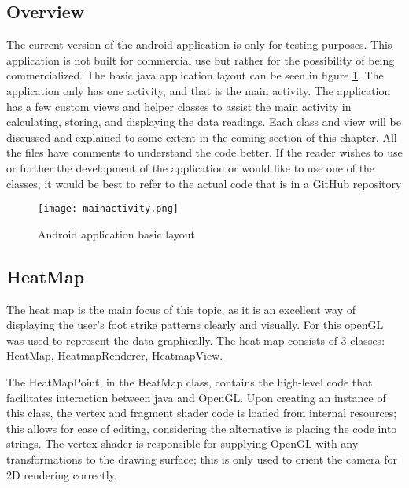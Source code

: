 \subsection{Overview}
The current version of the android application is only for testing purposes. This application is not built for commercial use but rather for the possibility of being commercialized. The basic java application layout can be seen in figure \ref{fig:javalayout}. The application only has one activity, and that is the main activity. The application has a few custom views and helper classes to assist the main activity in calculating, storing, and displaying the data readings. Each class and view will be discussed and explained to some extent in the coming section of this chapter. All the files have comments to understand the code better. If the reader wishes to use or further the development of the application or would like to use one of the classes, it would be best to refer to the actual code that is in a GitHub repository 

\begin{figure}[!htb]
  \centering
  \texttt{[image: mainactivity.png]}
  \caption{Android application basic layout}
  \label{fig:javalayout}
\end{figure}

\subsection{HeatMap}
The heat map is the main focus of this topic, as it is an excellent way of displaying the user's foot strike patterns clearly and visually. For this openGL was used to represent the data graphically. The heat map consists of 3 classes: HeatMap, HeatmapRenderer, HeatmapView.

The HeatMapPoint, in the HeatMap class, contains the high-level code that facilitates interaction between java and OpenGL. Upon creating an instance of this class, the vertex and fragment shader code is loaded from internal resources; this allows for ease of editing, considering the alternative is placing the code into strings. 
The vertex shader is responsible for supplying OpenGL with any transformations to the drawing surface; this is only used to orient the camera for 2D rendering correctly.

